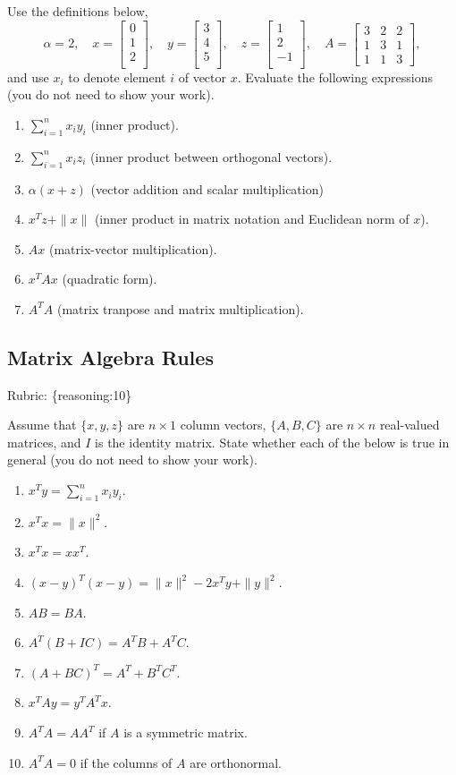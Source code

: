 \documentclass{article}
\def\rubric#1{\gre{Rubric: \{#1\}}}{}
\def\blu#1{{\color{blu}#1}}
\def\gre#1{{\color{gre}#1}}
\def\norm#1{\|#1\|}
\def\enum#1{\begin{enumerate}#1\end{enumerate}}
\begin{document}
Use the definitions below,
\[
\alpha = 2,\quad
x = \left[\begin{array}{c}
0\\
1\\
2\\
\end{array}\right], \quad
y = \left[\begin{array}{c}
3\\
4\\
5\\
\end{array}\right],\quad
z = \left[\begin{array}{c}
1\\
2\\
-1\\
\end{array}\right],\quad
A = \left[\begin{array}{ccc}
3 & 2 & 2\\
1 & 3 & 1\\
1 & 1 & 3
\end{array}\right],
\]
and use $x_i$ to denote element $i$ of vector $x$.
\blu{Evaluate the following expressions} (you do not need to show your work).
\enum{
\item $\sum_{i=1}^n x_iy_i$ (inner product).
\item $\sum_{i=1}^n x_iz_i$ (inner product between orthogonal vectors).
\item $\alpha(x+z)$ (vector addition and scalar multiplication)
\item $x^Tz + \norm{x}$ (inner product in matrix notation and Euclidean norm of $x$).
\item $Ax$ (matrix-vector multiplication).
\item $x^TAx$ (quadratic form).
\item $A^TA$ (matrix tranpose and matrix multiplication).
}
\subsection{Matrix Algebra Rules}
\rubric{reasoning:10}

Assume that $\{x,y,z\}$ are $n \times 1$ column vectors, $\{A,B,C\}$ are $n \times n$ real-valued matrices, and $I$ is the identity matrix. \blu{State whether each of the below is true in general} (you do not need to show your work).

\begin{enumerate}
\item $x^Ty = \sum_{i=1}^n x_iy_i$.
\item $x^Tx = \norm{x}^2$.
\item $x^Tx = xx^T$.
\item $(x-y)^T(x-y) = \norm{x}^2 - 2x^Ty + \norm{y}^2$.
\item $AB=BA$.
\item $A^T(B + IC) = A^TB + A^TC$.
\item $(A + BC)^T = A^T + B^TC^T$.
\item $x^TAy = y^TA^Tx$.
\item $A^TA = AA^T$ if $A$ is a symmetric matrix.
\item $A^TA = 0$ if the columns of $A$ are orthonormal.
\end{enumerate}
\end{document}
